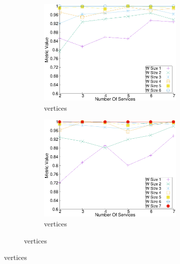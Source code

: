 \begin{figure}[H]
\begin{adjustbox}{minipage=\linewidth,scale=0.75}
\begin{subfigure}{0.45\textwidth}
    \begin{subfigure}{\textwidth}
      \includegraphics[width=\textwidth]{Images/graphs/window_quality_performance_diff_perce_n7_s7_50_89_n6}
      \caption{ vertices}
      \label{fig:quality_window_average_perce_n6}
    \end{subfigure}


    \begin{subfigure}{\textwidth}
      \includegraphics[width=\textwidth]{Images/graphs/window_quality_performance_diff_perce_n7_s7_50_89_n7}
      \caption{ vertices}
      \label{fig:quality_window_average_perce_n7}
    \end{subfigure}

  \end{subfigure}


\end{adjustbox}
\end{figure}
